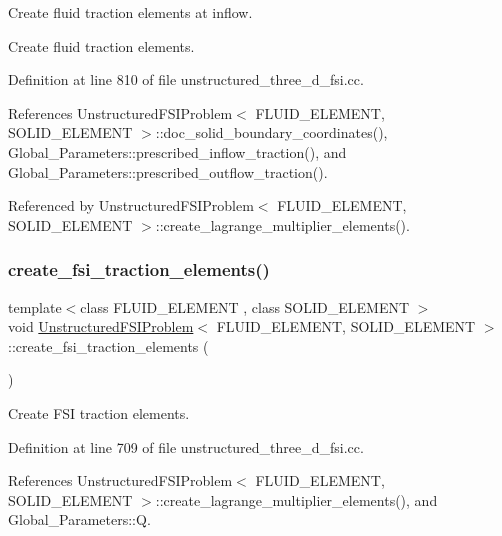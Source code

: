 Create fluid traction elements at inflow. 

Create fluid traction elements. 

Definition at line 810 of file unstructured\+\_\+three\+\_\+d\+\_\+fsi.\+cc.



References Unstructured\+F\+S\+I\+Problem$<$ F\+L\+U\+I\+D\+\_\+\+E\+L\+E\+M\+E\+N\+T, S\+O\+L\+I\+D\+\_\+\+E\+L\+E\+M\+E\+N\+T $>$\+::doc\+\_\+solid\+\_\+boundary\+\_\+coordinates(), Global\+\_\+\+Parameters\+::prescribed\+\_\+inflow\+\_\+traction(), and Global\+\_\+\+Parameters\+::prescribed\+\_\+outflow\+\_\+traction().



Referenced by Unstructured\+F\+S\+I\+Problem$<$ F\+L\+U\+I\+D\+\_\+\+E\+L\+E\+M\+E\+N\+T, S\+O\+L\+I\+D\+\_\+\+E\+L\+E\+M\+E\+N\+T $>$\+::create\+\_\+lagrange\+\_\+multiplier\+\_\+elements().

\mbox{\label{classUnstructuredFSIProblem_a934a587c99668fca969a72814b3142a7}} 
\subsubsection{\texorpdfstring{create\+\_\+fsi\+\_\+traction\+\_\+elements()}{create\_fsi\_traction\_elements()}}
{\footnotesize\ttfamily template$<$class F\+L\+U\+I\+D\+\_\+\+E\+L\+E\+M\+E\+NT , class S\+O\+L\+I\+D\+\_\+\+E\+L\+E\+M\+E\+NT $>$ \\
void \hyperlink{classUnstructuredFSIProblem}{Unstructured\+F\+S\+I\+Problem}$<$ F\+L\+U\+I\+D\+\_\+\+E\+L\+E\+M\+E\+NT, S\+O\+L\+I\+D\+\_\+\+E\+L\+E\+M\+E\+NT $>$\+::create\+\_\+fsi\+\_\+traction\+\_\+elements (\begin{DoxyParamCaption}{ }\end{DoxyParamCaption})}



Create F\+SI traction elements. 



Definition at line 709 of file unstructured\+\_\+three\+\_\+d\+\_\+fsi.\+cc.



References Unstructured\+F\+S\+I\+Problem$<$ F\+L\+U\+I\+D\+\_\+\+E\+L\+E\+M\+E\+N\+T, S\+O\+L\+I\+D\+\_\+\+E\+L\+E\+M\+E\+N\+T $>$\+::create\+\_\+lagrange\+\_\+multiplier\+\_\+elements(), and Global\+\_\+\+Parameters\+::Q.



